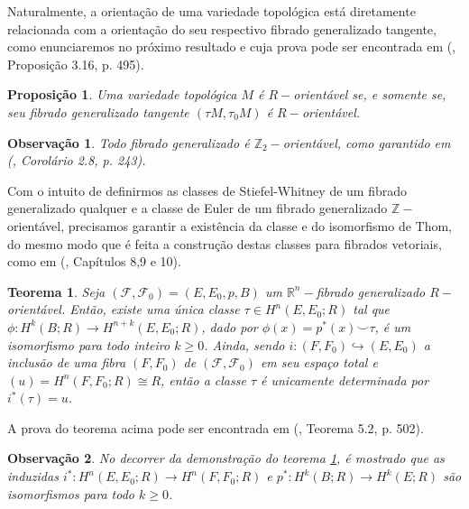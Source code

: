 \documentclass[12pt,oneside]{book} %
\newtheorem{teo}    {\hspace{0.5cm}Teorema}[chapter]
\newtheorem{prop}   {\hspace{0.5cm}Proposi\c c\~ao}[chapter]
\newtheorem{obs}    {\hspace{0.5cm}Observa\c{c}\~{a}o}[chapter]
\newcommand{\R}{\mathbb{R}}
\newcommand{\Z}{\mathbb{Z}}
\newcommand{\ccup}{\smile}
\begin{document}
\par Naturalmente, a orientação de uma variedade topológica está diretamente relacionada com a orientação do seu respectivo fibrado generalizado tangente, como enunciaremos no próximo resultado e cuja prova pode ser encontrada em (\cite{fadell_1}, Proposição 3.16, p. 495).

\begin{prop}\label{propriedade_orient_var}
	Uma variedade topológica $M$ é $R-$orientável se, e somente se, seu fibrado generalizado tangente $(\tau M,\tau_{0}M)$ é $R-$orientável.
\end{prop}

\begin{obs}
	Todo fibrado generalizado é $\Z_{2}-$orientável, como garantido em (\cite{allaud}, Corolário 2.8, p. 243).
\end{obs}

\par Com o intuito de definirmos as classes de Stiefel-Whitney de um fibrado generalizado qualquer e a classe de Euler de um fibrado generalizado $\Z-$orientável, precisamos garantir a existência da classe e do isomorfismo de Thom, do mesmo modo que é feita a construção destas classes para fibrados vetoriais, como em (\cite{milnor_1}, Capítulos 8,9 e 10).

\begin{teo}\label{teo_iso_thom_fht}
	Seja $(\mathcal{F},\mathcal{F}_{0})=(E,E_{0},p,B)$ um $\R^{n}-$fibrado generalizado $R-$orientável. Então, existe uma única classe $\tau\in H^{n}(E,E_{0};R)$ tal que $\phi:H^{k}(B;R)\to H^{n+k}(E,E_{0};R)$, dado por $\phi(x)=p^{*}(x)\ccup \tau$, é um isomorfismo para todo inteiro $k\geq 0$. Ainda, sendo $i:(F,F_{0})\hookrightarrow (E,E_{0})$ a inclusão de uma fibra $(F,F_{0})$ de $(\mathcal{F},\mathcal{F}_{0})$ em seu espaço total e $(u)=H^{n}(F,F_{0};R)\cong R$, então a classe $\tau$ é unicamente determinada por $i^{*}(\tau)=u$.
\end{teo}

\par A prova do teorema acima pode ser encontrada em (\cite{fadell_1}, Teorema 5.2, p. 502).

\begin{obs}\label{obs_proj_iso}
	No decorrer da demonstração do teorema \ref{teo_iso_thom_fht}, é mostrado que as induzidas $i^{*}:H^{n}(E,E_{0};R)\to H^{n}(F,F_{0};R)$ e $p^{*}:H^{k}(B;R)\to H^{k}(E;R)$ são isomorfismos para todo $k\geq 0$.
\end{obs}
\end{document}
